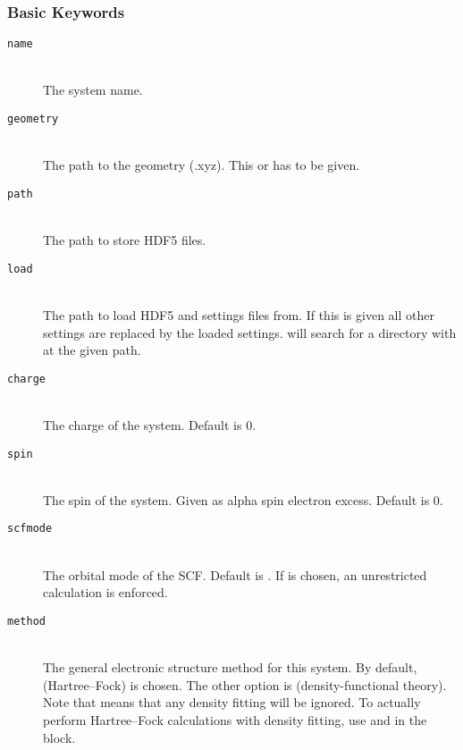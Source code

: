 \subsubsection{Basic Keywords}
\begin{description}
 \item [\texttt{name}]\hfill \\
   The system name.
 \item [\texttt{geometry}]\hfill \\
   The path to the geometry (.xyz). This or  has to be given.
   \item [\texttt{path}]\hfill \\
   The path to store HDF5 files.
   \item [\texttt{load}]\hfill \\
   The path to load HDF5 and settings files from. If this is given all other settings are replaced by the loaded settings. \serenity will search 
   for a directory with  at the given path.
   \item [\texttt{charge}]\hfill \\
   The charge of the system. Default is $0$.
   \item [\texttt{spin}]\hfill \\
   The spin of the system. Given as alpha spin electron excess. Default is $0$.
 \item [\texttt{scfmode}]\hfill \\
   The orbital mode of the SCF. Default is . If  is chosen, an unrestricted calculation is enforced.
  \item [\texttt{method}]\hfill \\
  The general electronic structure method for this system. By default,  (Hartree--Fock) is chosen. The other option is  (density-functional theory). Note that  means that any density fitting will be ignored. To actually perform Hartree--Fock calculations with density fitting, use  and  in the  block.
\end{description}

